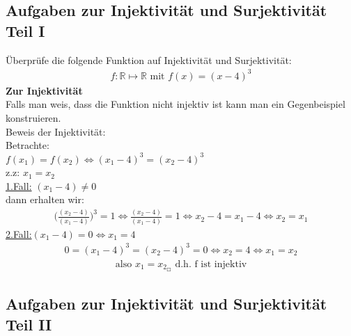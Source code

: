 \subsection{Aufgaben zur Injektivität und Surjektivität Teil I}

Überprüfe die folgende Funktion auf Injektivität und Surjektivität:
\begin{align*}
	f:\mathbb{R}\longmapsto\mathbb{R} \text{ mit } f(x)=(x-4)^3
\end{align*}
\textbf{Zur Injektivität}\\
Falls man weis, dass die Funktion nicht injektiv ist kann man ein Gegenbeispiel konstruieren.\\
Beweis der Injektivität:\\
Betrachte:\\ $f(x_1)=f(x_2)\Leftrightarrow (x_1-4)^3=(x_2-4)^3$\\
z.z: $x_1=x_2$\\
\underline{1.Fall:} $(x_1-4)\neq 0$\\
dann erhalten wir:\\
\begin{align*}
	\bigg(\frac{(x_2-4)}{(x_1-4)}\bigg)^3=1\Leftrightarrow\frac{(x_2-4)}{(x_1-4)}=1\Leftrightarrow x_2-4=x_1-4 \Leftrightarrow x_2=x_1
\end{align*} 
\underline{2.Fall:}$(x_1-4)=0\Leftrightarrow x_1=4$
\begin{align*}
	0=(x_1-4)^3=(x_2-4)^3=0\Leftrightarrow x_2=4\Leftrightarrow x_1=x_2
\end{align*}
\begin{align*}
	\text{also }x_1=x_{2_{\Square}}\text{    d.h. f ist injektiv}
\end{align*}
\subsection{Aufgaben zur Injektivität und Surjektivität Teil II}

